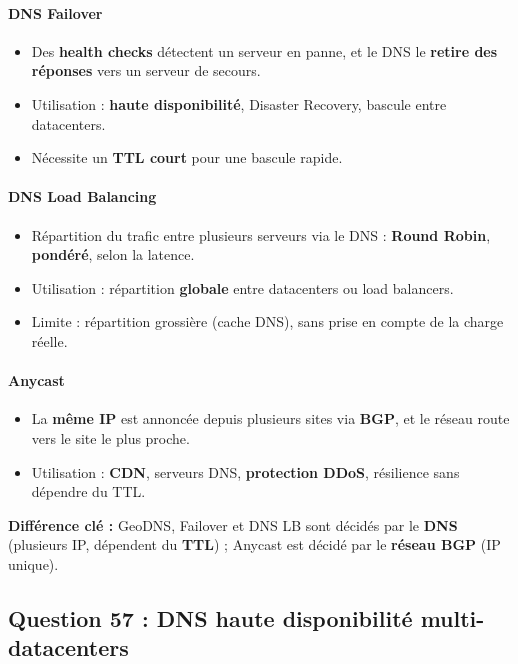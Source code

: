 \documentclass[12pt,a4paper]{article}
\begin{document}
\paragraph{DNS Failover}
\begin{itemize}
  \item Des \textbf{health checks} d\'etectent un serveur en panne, et le DNS le \textbf{retire des r\'eponses} vers un serveur de secours.
  \item Utilisation : \textbf{haute disponibilit\'e}, Disaster Recovery, bascule entre datacenters.
  \item N\'ecessite un \textbf{TTL court} pour une bascule rapide.
\end{itemize}

\paragraph{DNS Load Balancing}
\begin{itemize}
  \item R\'epartition du trafic entre plusieurs serveurs via le DNS : \textbf{Round Robin}, \textbf{pond\'er\'e}, selon la latence.
  \item Utilisation : r\'epartition \textbf{globale} entre datacenters ou load balancers.
  \item Limite : r\'epartition grossi\`ere (cache DNS), sans prise en compte de la charge r\'eelle.
\end{itemize}

\paragraph{Anycast}
\begin{itemize}
  \item La \textbf{m\^eme IP} est annonc\'ee depuis plusieurs sites via \textbf{BGP}, et le r\'eseau route vers le site le plus proche.
  \item Utilisation : \textbf{CDN}, serveurs DNS, \textbf{protection DDoS}, r\'esilience sans d\'ependre du TTL.
\end{itemize}

\medskip
\noindent\textbf{Diff\'erence cl\'e :} GeoDNS, Failover et DNS LB sont d\'ecid\'es par le \textbf{DNS} (plusieurs IP, d\'ependent du \textbf{TTL}) ; Anycast est d\'ecid\'e par le \textbf{r\'eseau BGP} (IP unique).

\subsection*{Question 57 : DNS haute disponibilit\'e multi-datacenters}
\end{document}
